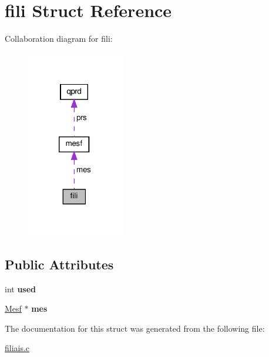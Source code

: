 \hypertarget{structfili}{}\section{fili Struct Reference}
\label{structfili}


Collaboration diagram for fili\+:
\nopagebreak
\begin{figure}[H]
\begin{center}
\leavevmode
\includegraphics[width=121pt]{structfili__coll__graph}
\end{center}
\end{figure}
\subsection*{Public Attributes}
\begin{DoxyCompactItemize}
\item 
\mbox{\label{structfili_a230d92e837158bb685ac8c5093e96bfd}} 
int {\bfseries used}
\item 
\mbox{\label{structfili_a928e63db2f379f26cf27fa73e02c3c3d}} 
\hyperlink{structmesf}{Mesf} $\ast$ {\bfseries mes}
\end{DoxyCompactItemize}


The documentation for this struct was generated from the following file\+:\begin{DoxyCompactItemize}
\item 
\hyperlink{filiais_8c}{filiais.\+c}\end{DoxyCompactItemize}
